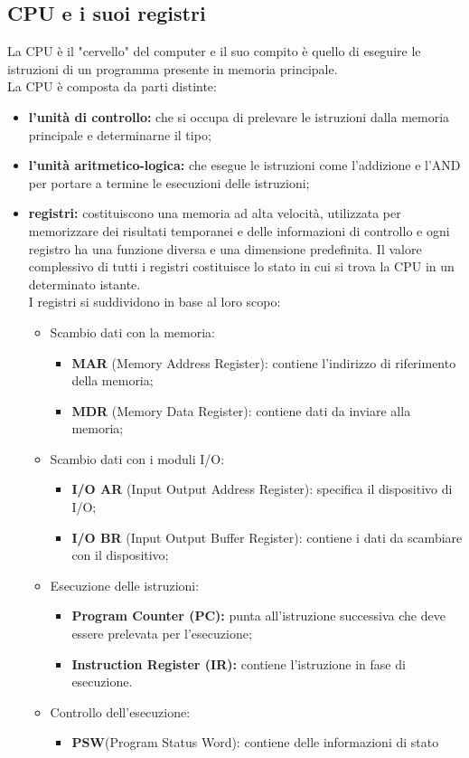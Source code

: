 \documentclass[12pt]{report}
\begin{document}
\subsection{CPU e i suoi registri}
La CPU è il "cervello" del computer e il suo compito è quello di  eseguire le istruzioni di un programma presente in memoria principale. \\
La CPU è composta da parti distinte:
\begin{itemize}
	\item \textbf{l'unità di controllo:} che si occupa di prelevare le istruzioni dalla memoria principale e determinarne il tipo;
	\item \textbf{l'unità aritmetico-logica:} che esegue le istruzioni come l'addizione e l'AND per portare a termine le esecuzioni delle istruzioni;
	\item \textbf{registri:} costituiscono una memoria ad alta velocità, utilizzata per memorizzare dei risultati temporanei e delle informazioni di controllo e ogni registro ha una funzione diversa e una dimensione predefinita. Il valore complessivo di tutti i registri costituisce lo stato in cui si trova la CPU in un determinato istante.\\
	I registri si suddividono in base al loro scopo:
	\begin{itemize}
		\item Scambio dati con la memoria:
		\begin{itemize}
			\item \textbf{MAR} (Memory Address Register): contiene l'indirizzo di riferimento della memoria;
			\item \textbf{MDR} (Memory Data Register): contiene dati da inviare alla memoria;
		\end{itemize}
		\item Scambio dati con i moduli I/O:
		\begin{itemize}
			\item \textbf{I/O AR} (Input Output Address Register): specifica il dispositivo di I/O;
			\item \textbf{I/O BR} (Input Output Buffer Register): contiene i dati da scambiare con il dispositivo;
		\end{itemize}
		\item Esecuzione delle istruzioni:
		\begin{itemize}
			\item \textbf{Program Counter (PC):} punta all'istruzione successiva che deve essere prelevata per l'esecuzione;
			\item \textbf{Instruction Register (IR):} contiene l'istruzione in fase di esecuzione.
		\end{itemize}
		\item Controllo dell'esecuzione:
		\begin{itemize}
			\item \textbf{PSW}(Program Status Word): contiene delle informazioni di stato
		\end{itemize}
	\end{itemize}
\end{itemize}
\end{document}
